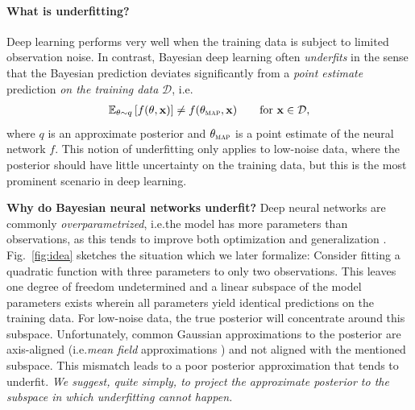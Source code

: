 \paragraph{What is underfitting?}
Deep learning performs very well when the training data is subject to limited observation noise. In contrast, Bayesian deep learning often \emph{underfits} in the sense that the Bayesian prediction deviates significantly from a \emph{point estimate} prediction \emph{on the training data} $\mathcal{D}$, i.e.
\begin{align}
  \mathbb{E}_{\theta \sim q} \left[f(\theta, \mathbf{x})\right] \neq f(\theta_{\textsc{map}}, \mathbf{x})
  \qquad
  \text{for } \mathbf{x} \in \mathcal{D},
\end{align}
%
where $q$ is an approximate posterior and $\theta_{\textsc{map}}$ is a point estimate of the neural network $f$.
This notion of underfitting only applies to low-noise data, where the posterior should have little uncertainty on the training data, but this is the most prominent scenario in deep learning.  %


\textbf{Why do Bayesian neural networks underfit?}
Deep neural networks are commonly \emph{overparametrized}, i.e.\@ the model has more parameters than observations, as this tends to improve both optimization and generalization \citep{allen2019learning}. Fig.~\ref{fig:idea} sketches the situation which we later formalize: Consider fitting a quadratic function with three parameters to only two observations. This leaves one degree of freedom undetermined and a linear subspace of the model parameters exists wherein all parameters yield identical predictions on the training data. For low-noise data, the true posterior will concentrate around this subspace. Unfortunately, common Gaussian approximations to the posterior are axis-aligned (i.e.\@ \emph{mean field} approximations \citep{bishop2006pattern}) and not aligned with the mentioned subspace. This mismatch leads to a poor posterior approximation that tends to underfit. \emph{We suggest, quite simply, to project the approximate posterior to the subspace in which underfitting cannot happen.}

